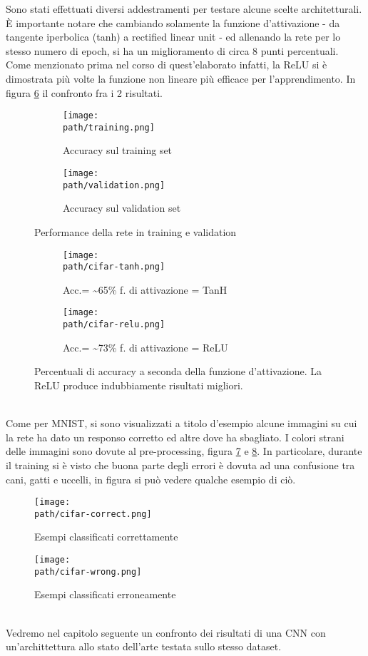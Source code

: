 Sono stati effettuati diversi addestramenti per testare alcune scelte architetturali. È importante notare che cambiando solamente la funzione d'attivazione - da tangente iperbolica (tanh) a rectified linear unit - ed allenando la rete per lo stesso numero di epoch, si ha un miglioramento di circa 8 punti percentuali. Come menzionato prima nel corso di quest'elaborato infatti, la ReLU si è dimostrata più volte la funzione non lineare più efficace per l'apprendimento. In figura \ref{fig:relu} il confronto fra i 2 risultati.
\begin{figure}
\centering
\begin{subfigure}{.5\textwidth}
  \centering
 \texttt{[image: \\path/training.png]} 
  \caption{Accuracy sul training set}
 \label{fig:training}
\end{subfigure}%
\begin{subfigure}{.5\textwidth}
  \centering
 \texttt{[image: \\path/validation.png]} 
  \caption{Accuracy sul validation set}
 \label{fig:validation}
\end{subfigure}
\caption{Performance della rete in training e validation}
\label{fig:cifar-compare}
\end{figure} 

\begin{figure}
\centering
\begin{subfigure}{.5\textwidth}
  \centering
 \texttt{[image: \\path/cifar-tanh.png]} 
  \caption{Acc.= \textasciitilde 65\% f. di attivazione = TanH}
 \label{fig:training}
\end{subfigure}%
\begin{subfigure}{.5\textwidth}
  \centering
 \texttt{[image: \\path/cifar-relu.png]} 
  \caption{Acc.= \textasciitilde 73\% f. di attivazione = ReLU}
 \label{fig:validation}
\end{subfigure}
\caption{Percentuali di accuracy a seconda della funzione d'attivazione. La ReLU produce indubbiamente risultati migliori.}
\label{fig:relu}
\end{figure}
\\
\medskip 
Come per MNIST, si sono visualizzati a titolo d'esempio alcune immagini su cui la rete ha dato un responso corretto ed altre dove ha sbagliato. I colori strani delle immagini sono dovute al pre-processing, figura \ref{fig:cifar-correct} e \ref{fig:cifar-wrong}. In particolare, durante il training si è visto che buona parte degli errori è dovuta ad una confusione tra cani, gatti e uccelli, in figura si può vedere qualche esempio di ciò. 
\begin{figure}[h!]
 \centering
 \texttt{[image: \\path/cifar-correct.png]} 
 \caption{Esempi classificati correttamente}
 \label{fig:cifar-correct}
\end{figure}
\begin{figure}[h!]
 \centering
 \texttt{[image: \\path/cifar-wrong.png]} 
 \caption{Esempi classificati erroneamente}
 \label{fig:cifar-wrong}
\end{figure}
\\
Vedremo nel capitolo seguente un confronto dei risultati di una CNN con un'archittettura allo stato dell'arte testata sullo stesso dataset. 